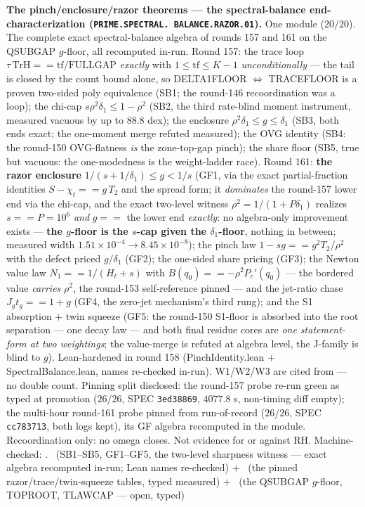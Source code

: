 \par\smallskip\noindent\textbf{The pinch/enclosure/razor
theorems --- the spectral-balance end-characterization
(\texttt{PRIME.\allowbreak SPECTRAL.\allowbreak
BALANCE.\allowbreak RAZOR.01}).}
One module ($20/20$).  The complete exact spectral-balance
algebra of rounds 157 and 161 on the QSUBGAP $g$-floor, all
recomputed in-run.  Round 157: the trace loop $\tau\,\mathrm{TrH}
== \mathrm{tf}/\mathrm{FULLGAP}$ \emph{exactly} with $1 \le
\mathrm{tf} \le K - 1$ \emph{unconditionally} --- the tail is
closed by the count bound alone, so DELTA1FLOOR
$\Leftrightarrow$ TRACEFLOOR is a proven two-sided poly
equivalence (SB1; the round-146 recoordination was a loop); the
chi-cap $s\rho^2\delta_1 \le 1 - \rho^2$ (SB2, the third
rate-blind moment instrument, measured vacuous by up to $88.8$
dex); the enclosure $\rho^2\delta_1 \le g \le \delta_1$ (SB3,
both ends exact; the one-moment merge refuted measured); the OVG
identity (SB4: the round-150 OVG-flatness \emph{is} the
zone-top-gap pinch); the share floor (SB5, true but vacuous: the
one-modedness is the weight-ladder race).  Round 161: \textbf{the
razor enclosure} $1/(s + 1/\delta_1) \le g < 1/s$ (GF1, via the
exact partial-fraction identities $S - \chi_t == g\,T_2$ and the
spread form; it \emph{dominates} the round-157 lower end via the
chi-cap, and the exact two-level witness $\rho^2 = 1/(1 +
P\delta_1)$ realizes $s == P = 10^6$ \emph{and} $g ==$ the lower
end \emph{exactly}: no algebra-only improvement exists ---
\textbf{the $g$-floor is the $s$-cap given the $\delta_1$-floor},
nothing in between; measured width $1.51\times10^{-4} \to
8.45\times10^{-8}$); the pinch law $1 - sg == g^2 T_2/\rho^2$
with the defect priced $g/\delta_1$ (GF2); the one-sided share
pricing (GF3); the Newton value law $N_1 == 1/(H_t + s)$ with
$B(q_0) == -\rho^2 P_c'(q_0)$ --- the bordered value
\emph{carries} $\rho^2$, the round-153 self-reference pinned ---
and the jet-ratio chase $J_g t_g == 1 + g$ (GF4, the zero-jet
mechanism's third rung); and the S1 absorption $+$ twin squeeze
(GF5: the round-150 S1-floor is absorbed into the root
separation --- one decay law --- and both final residue cores
are \emph{one statement-form at two weightings}; the value-merge
is refuted at algebra level, the J-family is blind to $g$).
Lean-hardened in round 158 (PinchIdentity.lean $+$
SpectralBalance.lean, names re-checked in-run).  W1/W2/W3 are
cited from  --- no
double count.  Pinning split disclosed: the round-157 probe
re-run green as typed at promotion ($26/26$, SPEC
\texttt{3ed38869}, $4077.8$ s, non-timing diff empty); the
multi-hour round-161 probe pinned from run-of-record ($26/26$,
SPEC \texttt{cc783713}, both logs kept), its GF algebra
recomputed in the module.  Recoordination only: no omega closes.
Not evidence for or against RH.
Machine-checked:
.
\mE\ (SB1--SB5, GF1--GF5, the two-level sharpness witness ---
exact algebra recomputed in-run; Lean names re-checked) $+$ \mC\
(the pinned razor/trace/twin-squeeze tables, typed measured) $+$
\mO\ (the QSUBGAP $g$-floor, TOPROOT, TLAWCAP --- open, typed)
\par\smallskip


